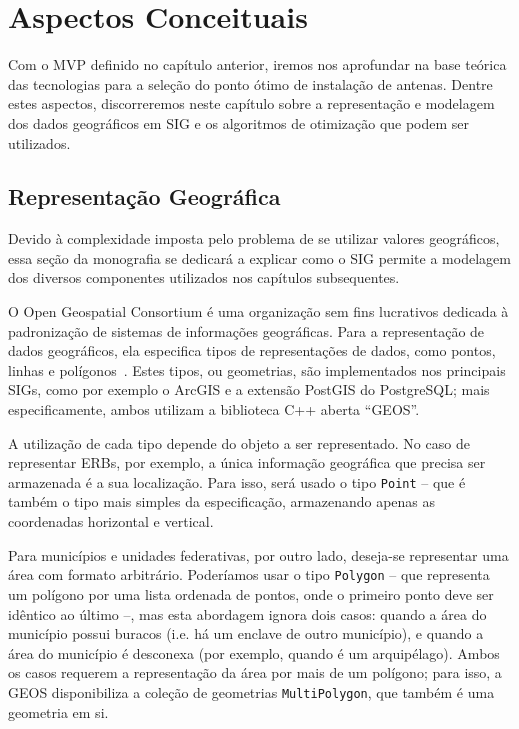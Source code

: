 \documentclass[]{politex}
\newcommand*\NewPage{\newpage\null\thispagestyle{empty}\newpage}
\begin{document}
\NewPage
\chapter{Aspectos Conceituais}

Com o MVP definido no capítulo anterior, iremos nos aprofundar na base teórica
das tecnologias para a seleção do ponto ótimo de instalação de antenas. Dentre
estes aspectos, discorreremos neste capítulo sobre a representação e modelagem
dos dados geográficos em SIG e os algoritmos de otimização que podem ser
utilizados.

\section{Representação Geográfica}

Devido à complexidade imposta pelo problema de se utilizar valores geográficos,
essa seção da monografia se dedicará a explicar como o SIG permite a modelagem
dos diversos componentes utilizados nos capítulos subsequentes.

O Open Geospatial Consortium é uma organização sem fins lucrativos dedicada à
padronização de sistemas de informações geográficas. Para a representação de
dados geográficos, ela especifica tipos de representações de dados, como pontos,
linhas e polígonos~\cite{opengis}. Estes tipos, ou geometrias, são implementados
nos principais SIGs, como por exemplo o ArcGIS e a extensão PostGIS do
PostgreSQL; mais especificamente, ambos utilizam a biblioteca C++ aberta
``GEOS''.

A utilização de cada tipo depende do objeto a ser representado. No caso de
representar ERBs, por exemplo, a única informação geográfica que precisa ser
armazenada é a sua localização. Para isso, será usado o tipo \texttt{Point} --
que é também o tipo mais simples da especificação, armazenando apenas as
coordenadas horizontal e vertical.

Para municípios e unidades federativas, por outro lado, deseja-se representar
uma área com formato arbitrário. Poderíamos usar o tipo \texttt{Polygon} -- que
representa um polígono por uma lista ordenada de pontos, onde o primeiro ponto
deve ser idêntico ao último --, mas esta abordagem ignora dois casos: quando a
área do município possui buracos (i.e. há um enclave de outro município), e
quando a área do município é desconexa (por exemplo, quando é um arquipélago).
Ambos os casos requerem a representação da área por mais de um polígono; para
isso, a GEOS disponibiliza a coleção de geometrias \texttt{MultiPolygon}, que
também é uma geometria em si.
\end{document}

